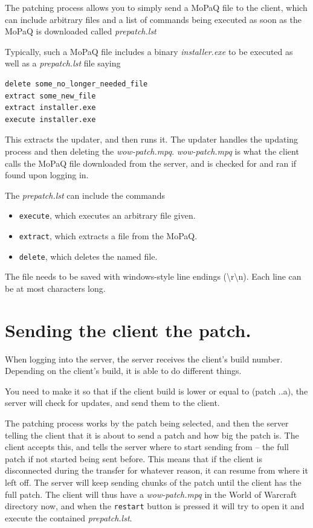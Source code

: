 \documentclass{article}
\newcommand{\wow}{World of Warcraft\xspace}
\newcommand{\mpq}{MoPaQ\xspace}
\newcommand{\file}[1]{\emph{#1}\xspace}
\newcommand{\cmd}[1]{\lstinline{#1}\xspace}
\begin{document}
The patching process allows you to simply send a \mpq file to the client, which can include arbitrary files and a list of commands being executed as soon as the \mpq is downloaded called \file{prepatch.lst}

Typically, such a \mpq file includes a binary \file{installer.exe} to be executed as well as a \file{prepatch.lst} file saying 
\begin{lstlisting}
delete some_no_longer_needed_file
extract some_new_file
extract installer.exe
execute installer.exe
\end{lstlisting}

This extracts the updater, and then runs it. The updater handles the updating process and then deleting the \file{wow-patch.mpq}. \file{wow-patch.mpq} is what the client calls the \mpq file downloaded from the server,  and is checked for and ran if found upon logging in.

The \file{prepatch.lst} can include the commands
\begin{itemize}
	\item \cmd{execute}, which executes an arbitrary file given.
	\item \cmd{extract}, which extracts a file from the \mpq.
	\item \cmd{delete}, which deletes the named file.
\end{itemize}
The file needs to be saved with windows-style line endings (\textbackslash r\textbackslash n). Each line can be at most  characters long.

\section{Sending the client the patch.}

When logging into the server, the server receives the client's build number. Depending on the client's build, it is able to do different things.

You need to make it so that if the client build is lower or equal to  (patch ..a), the server will check for updates, and send them to the client.

The patching process works by the patch being selected, and then the server telling the client that it is about to send a patch and how big the patch is. The client accepts this, and tells the server where to start sending from  -- the full patch if not started being sent before. This means that if the client is disconnected during the transfer for whatever reason, it can resume from where it left off. The server will keep sending  chunks of the patch until the client has the full patch. The client will thus have a \file{wow-patch.mpq} in the \wow directory now, and when the \cmd{restart} button is pressed it will try to open it and execute the contained \file{prepatch.lst}.
\end{document}
